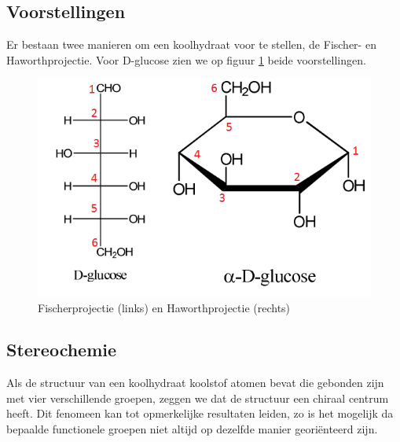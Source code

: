 \documentclass[a4paper,kul]{kulakarticle} %
\begin{document}
\subsection{Voorstellingen}
Er bestaan twee manieren om een koolhydraat voor te stellen, de Fischer- en Haworthprojectie. Voor D-glucose zien we op figuur \ref{fig:fishervshaworth} beide voorstellingen.
\begin{figure}[h]
	\centering
	\includegraphics[width=0.6\linewidth]{FisherVSHaworth}
	\caption[Fischer- en Haworthprojectie]{Fischerprojectie (links) en Haworthprojectie (rechts)}
	\label{fig:fishervshaworth}
\end{figure}

\subsection{Stereochemie}
Als de structuur van een koolhydraat koolstof atomen bevat die gebonden zijn met vier verschillende groepen, zeggen we dat de structuur een chiraal centrum heeft. Dit fenomeen kan tot opmerkelijke resultaten leiden, zo is het mogelijk da bepaalde functionele groepen niet altijd op dezelfde manier georiënteerd zijn.  
\end{document}
